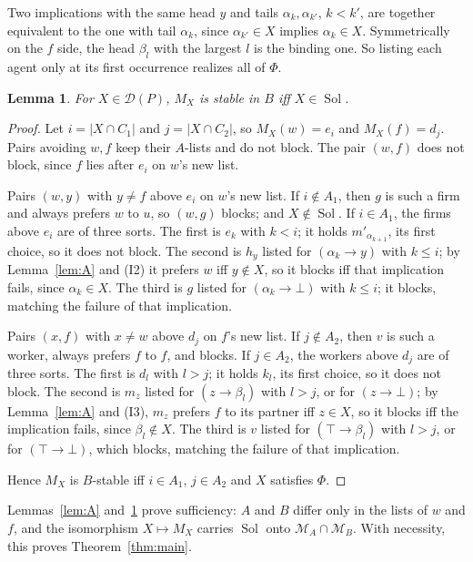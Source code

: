 \documentclass[11pt]{article}
\newtheorem{lemma}[theorem]{Lemma}
\theoremstyle{definition}
\theoremstyle{remark}
\newcommand{\D}{\mathcal D}
\newcommand{\Sol}{\operatorname{Sol}}
\begin{document}
Two implications with the same head $y$ and tails $\alpha_k,\alpha_{k'}$, $k<k'$, are together equivalent to the one with tail $\alpha_k$, since $\alpha_{k'}\in X$ implies $\alpha_k\in X$. Symmetrically on the $f$ side, the head $\beta_l$ with the largest $l$ is the binding one. So listing each agent only at its first occurrence realizes all of $\Phi$.

\begin{lemma}\label{lem:B}
For $X\in\D(P)$, $M_X$ is stable in $B$ iff $X\in\Sol$.
\end{lemma}

\begin{proof}
Let $i=|X\cap C_1|$ and $j=|X\cap C_2|$, so $M_X(w)=e_i$ and $M_X(f)=d_j$. Pairs avoiding $w,f$ keep their $A$-lists and do not block. The pair $(w,f)$ does not block, since $f$ lies after $e_i$ on $w$'s new list.

Pairs $(w,y)$ with $y\ne f$ above $e_i$ on $w$'s new list. If $i\notin A_1$, then $g$ is such a firm and always prefers $w$ to $u$, so $(w,g)$ blocks; and $X\notin\Sol$. If $i\in A_1$, the firms above $e_i$ are of three sorts. The first is $e_k$ with $k<i$; it holds $m'_{\alpha_{k+1}}$, its first choice, so it does not block. The second is $h_y$ listed for $(\alpha_k\to y)$ with $k\le i$; by Lemma~\ref{lem:A} and (I2) it prefers $w$ iff $y\notin X$, so it blocks iff that implication fails, since $\alpha_k\in X$. The third is $g$ listed for $(\alpha_k\to\bot)$ with $k\le i$; it blocks, matching the failure of that implication.

Pairs $(x,f)$ with $x\ne w$ above $d_j$ on $f$'s new list. If $j\notin A_2$, then $v$ is such a worker, always prefers $f$ to $\hat f$, and blocks. If $j\in A_2$, the workers above $d_j$ are of three sorts. The first is $d_l$ with $l>j$; it holds $k_l$, its first choice, so it does not block. The second is $m_z$ listed for $(z\to\beta_l)$ with $l>j$, or for $(z\to\bot)$; by Lemma~\ref{lem:A} and (I3), $m_z$ prefers $f$ to its partner iff $z\in X$, so it blocks iff the implication fails, since $\beta_l\notin X$. The third is $v$ listed for $(\top\to\beta_l)$ with $l>j$, or for $(\top\to\bot)$, which blocks, matching the failure of that implication.

Hence $M_X$ is $B$-stable iff $i\in A_1$, $j\in A_2$ and $X$ satisfies $\Phi$.
\end{proof}

Lemmas~\ref{lem:A} and~\ref{lem:B} prove sufficiency: $A$ and $B$ differ only in the lists of $w$ and $f$, and the isomorphism $X\mapsto M_X$ carries $\Sol$ onto $\mathcal M_A\cap\mathcal M_B$. With necessity, this proves Theorem~\ref{thm:main}.
\end{document}
